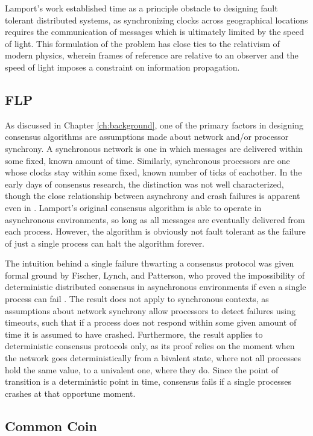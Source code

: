 Lamport's work established time as a principle obstacle to designing fault tolerant distributed systems,
as synchronizing clocks across geographical locations requires the communication of messages 
which is ultimately limited by the speed of light.
This formulation of the problem has close ties to the relativism of modern physics,
wherein frames of reference are relative to an observer and the speed of light imposes a constraint on information propagation.

\subsection{FLP}
As discussed in Chapter \ref{ch:background}, 
one of the primary factors in designing consensus algorithms are assumptions made about 
network and/or processor synchrony. 
A synchronous network is one in which messages are delivered within some fixed, 
known amount of time. 
Similarly, synchronous processors are one whose clocks stay within some fixed, 
known number of ticks of eachother.
In the early days of consensus research, the distinction was not well characterized, 
though the close relationship between asynchrony and crash failures is apparent even in \cite{clocks}.
Lamport's original consensus algorithm is able to operate in asynchronous environments, 
so long as all messages are eventually delivered from each process.
However, the algorithm is obviously not fault tolerant as the failure of just a single process can halt the algorithm forever.

The intuition behind a single failure thwarting a consensus protocol was given formal ground by Fischer, Lynch, and Patterson,
who proved the impossibility of deterministic distributed consensus in asynchronous environments if even a single process can fail \cite{flp}.
The result does not apply to synchronous contexts, 
as assumptions about network synchrony allow processors to detect failures using timeouts, 
such that if a process does not respond within some given amount of time it is assumed to have crashed.
Furthermore, the result applies to deterministic consensus protocols only, 
as its proof relies on the moment when the network goes deterministically from a bivalent state, 
where not all processes hold the same value, to a univalent one, where they do.
Since the point of transition is a deterministic point in time, 
consensus fails if a single processes crashes at that opportune moment.

\subsection{Common Coin}

